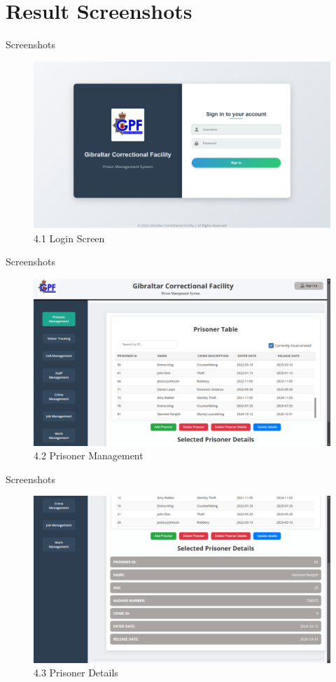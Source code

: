 \documentclass[aspectratio=169]{beamer}
\begin{document}
\section{Result Screenshots}
\begin{frame}{Screenshots}
    \begin{figure}
        \centering
        \includegraphics[width=0.6\linewidth]{login.png}
        \caption{4.1 Login Screen}
        \label{fig:login}
    \end{figure}
\end{frame}
\begin{frame}{Screenshots}
    \begin{figure}
        \centering
        \includegraphics[width=0.6\linewidth]{prisonermgmt.png}
        \caption{4.2 Prisoner Management}
        \label{fig:pmgmt}
    \end{figure}
\end{frame}
\begin{frame}{Screenshots}
    \begin{figure}
        \centering
        \includegraphics[width=0.6\linewidth]{prisonerdet.png}
        \caption{4.3 Prisoner Details}
        \label{fig:pdet}
    \end{figure}
\end{frame}
\end{document}
